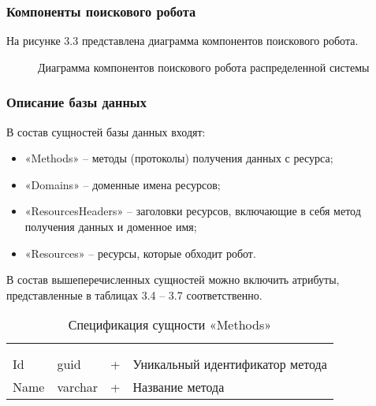 \subsubsection{Компоненты поискового робота}

На рисунке 3.3 представлена диаграмма компонентов поискового робота.

\begin{figure}[H]
\caption{Диаграмма компонентов поискового робота распределенной системы}
\label{robot/diagram_components:image}
\end{figure}

\subsubsection{Описание базы данных}

В состав сущностей базы данных входят:
\begin{itemize}
\item «Methods» -- методы (протоколы) получения данных с ресурса;
\item «Domains» -- доменные имена ресурсов;
\item «ResourcesHeaders» -- заголовки ресурсов, включающие в себя метод получения данных и доменное имя;
\item «Resources» -- ресурсы, которые обходит робот.
\end{itemize}

В состав вышеперечисленных сущностей можно включить атрибуты, представленные в таблицах 3.4 – 3.7 соответственно.

\begin{xltabular}{\textwidth}{|X|X|X|X|}
	\caption{Спецификация сущности «Methods»}\label{crawler_methods:table}\\ \hline
	 &  &  &  \\ \hline
	 &  &  &  \\ \hline
	\endfirsthead
	 \hline
	 &  &  &  \\ \hline
	\endhead
	Id & guid & + & Уникальный идентификатор метода \\ \hline
	Name & varchar & + & Название метода \\ \hline
\end{xltabular}

